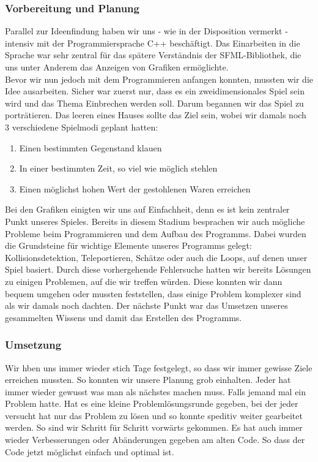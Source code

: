 \documentclass[12pt,a4paper]{scrartcl}
\begin{document}
\subsubsection{Vorbereitung und Planung}
Parallel zur Ideenfindung haben wir uns - wie in der
Disposition vermerkt - intensiv mit der Programmiersprache C++ beschäftigt. Das Einarbeiten
in die Sprache war sehr zentral für das spätere Verständnis der SFML-Bibliothek, die uns
unter Anderem das Anzeigen von Grafiken ermöglichte.
\\
Bevor wir nun jedoch mit dem Programmieren anfangen konnten, mussten wir die Idee ausarbeiten.
Sicher war zuerst nur, dass es ein zweidimensionales Spiel sein wird und das Thema Einbrechen werden soll.
Darum begannen wir das Spiel zu porträtieren. 
Das leeren eines Hauses sollte das Ziel sein, wobei wir damals noch 3 verschiedene Spielmodi geplant hatten:
\begin{enumerate}
\item Einen bestimmten Gegenstand klauen
\item In einer bestimmten Zeit, so viel wie möglich stehlen
\item Einen möglichst hohen Wert der gestohlenen Waren erreichen
\end{enumerate}
Bei den Grafiken einigten wir uns auf Einfachheit, denn es ist kein zentraler Punkt unseres Spieles.
Bereits in diesem Stadium besprachen wir auch mögliche Probleme beim Programmieren und dem Aufbau des Programms.
Dabei wurden die Grundsteine für wichtige Elemente unseres Programms gelegt: Kollisionsdetektion, Teleportieren, Schätze oder auch die Loops, auf denen unser Spiel basiert. 
Durch diese vorhergehende Fehlersuche hatten wir bereits Lösungen zu einigen Problemen, auf die wir treffen würden. Diese konnten wir dann bequem umgehen oder mussten feststellen, dass einige Problem komplexer sind als wir damals noch dachten.
Der nächste Punkt war das Umsetzen unseres gesammelten Wissens und damit das Erstellen des Programms.

\subsubsection{Umsetzung}
Wir hben uns immer wieder stich Tage festgelegt, so dass wir immer gewisse Ziele erreichen mussten. So konnten wir unsere Planung grob einhalten. Jeder hat immer wieder gewusst was man als nächstes machen muss. Falls jemand mal ein Problem hatte. Hat es eine kleine Problemlösungsrunde gegeben, bei der jeder versucht hat nur das Problem zu lösen und so konnte speditiv weiter gearbeitet werden. So sind wir Schritt für Schritt vorwärts gekommen. Es hat auch immer wieder Verbesserungen oder Abänderungen gegeben am alten Code. So dass der Code jetzt möglichst einfach und optimal ist. 
\end{document}
